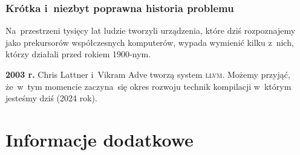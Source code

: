 \documentclass[10pt,t]{beamer}
\begin{document}











\begin{frame}
  \frametitle{Krótka i~niezbyt poprawna historia problemu}


  Na~przestrzeni tysięcy lat ludzie tworzyli urządzenia, które dziś
  rozpoznajemy jako prekursorów współczesnych komputerów, wypada wymienić
  kilku z~nich, którzy działali przed rokiem 1900-nym.

  \textbf{2003 r.} Chris Lattner i~Vikram Adve tworzą system \textsc{llvm}.
  Możemy przyjąć, że~w~tym momencie zaczyna~się okres rozwoju technik
  kompilacji w~którym jesteśmy dziś (2024 rok).

\end{frame}



















































\section{Informacje dodatkowe}
\end{document}
